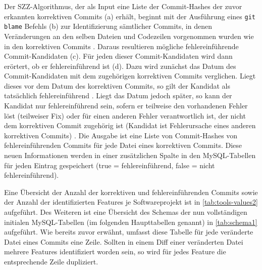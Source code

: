Der SZZ-Algorithmus, der als Input eine Liste der Commit-Hashes der zuvor erkannten korrektiven Commits (a) erhält, beginnt mit der Ausführung eines \texttt{git blame} Befehls (b) zur Identifizierung sämtlicher Commits, in denen Veränderungen an den selben Dateien und Codezeilen vorgenommen wurden wie in den korrektiven Commits \cite{Borg2019}. Daraus resultieren mögliche fehlereinführende Commit-Kandidaten (c). Für jeden dieser Commit-Kandidaten wird dann erörtert, ob er fehlereinführend ist (d). Dazu wird zunächst das Datum des Commit-Kandidaten mit dem zugehörigen korrektiven Commits verglichen. Liegt dieses vor dem Datum des korrektiven Commits, so gilt der Kandidat als tatsächlich fehlereinführend \cite{Borg2019}. Liegt das Datum jedoch später, so kann der Kandidat nur fehlereinführend sein, sofern er teilweise den vorhandenen Fehler löst (teilweiser Fix) oder für einen anderen Fehler verantwortlich ist, der nicht dem korrektiven Commit zugehörig ist (Kandidat ist Fehlerursache eines anderen korrektiven Commits) \cite{Borg2019}. Die Ausgabe ist eine Liste von Commit-Hashes von fehlereinführenden Commits für jede Datei eines korrektiven Commits. Diese neuen Informationen werden in einer zusätzlichen Spalte in den MySQL-Tabellen für jeden Eintrag gespeichert (true = fehlereinführend, false = nicht fehlereinführend). 

Eine Übersicht der Anzahl der korrektiven und fehlereinführenden Commits sowie der Anzahl der identifizierten Features je Softwareprojekt ist in \autoref{tab:tools-values2} aufgeführt. Des Weiteren ist eine Übersicht des Schemas der nun vollständigen initialen MySQL-Tabellen (im folgenden Haupttabellen genannt) in \autoref{tab:schema1} aufgeführt. Wie bereits zuvor erwähnt, umfasst diese Tabelle für jede veränderte Datei eines Commits eine Zeile. Sollten in einem Diff einer veränderten Datei mehrere Features identifiziert worden sein, so wird für jedes Feature die entsprechende Zeile dupliziert.

